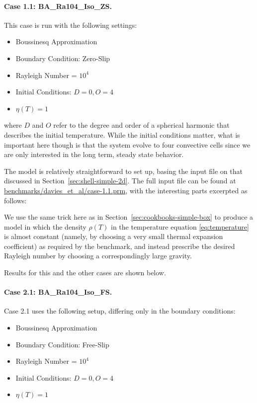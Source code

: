 \documentclass{article}
\begin{document}
\paragraph{Case 1.1: BA\_Ra104\_Iso\_ZS.}
\label{sec:davies-case11_BA}

This case is run with the following settings:
\begin{itemize}
\item Boussinesq Approximation
\item Boundary Condition: Zero-Slip
\item Rayleigh Number = $10^4$ 
\item Initial Conditions: $D = 0, O = 4$
\item $\eta(T) = 1$
\end{itemize}
where $D$ and $O$ refer to the degree and order of a spherical harmonic that describes the 
initial temperature. While the initial conditions matter, what is important
here though is that the system evolve to four convective cells since we are
only interested in the long term, steady state behavior.

The model is relatively straightforward to set up, basing the input file on
that discussed in Section~\ref{sec:shell-simple-2d}. The full input file can
be found at \url{benchmarks/davies_et_al/case-1.1.prm}, with the interesting
parts excerpted as follows:



We use the same trick here as in Section~\ref{sec:cookbooks-simple-box} to
produce a model in which the density $\rho(T)$ in the temperature equation
\eqref{eq:temperature} is almost constant (namely, by choosing a very small
thermal expansion coefficient) as required by the benchmark, and instead
prescribe the desired Rayleigh number by choosing a correspondingly large
gravity.

Results for this and the other cases are shown below.


\paragraph{Case 2.1: BA\_Ra104\_Iso\_FS.}
\label{sec:davies-case21_BA}

Case 2.1 uses the following setup, differing only in the boundary conditions:
\begin{itemize}
\item Boussinesq Approximation
\item Boundary Condition: Free-Slip
\item Rayleigh Number = $10^4$ 
\item Initial Conditions: $D = 0, O = 4$
\item $\eta(T) = 1$
\end{itemize}
\end{document}
